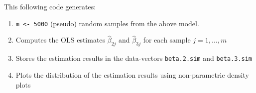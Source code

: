 \documentclass[
]{book}
\providecommand{\tightlist}{%
  \setlength{\itemsep}{0pt}\setlength{\parskip}{0pt}}
\begin{document}
\hfill\break

This following code generates:

\begin{enumerate}
\def\labelenumi{\arabic{enumi}.}
\tightlist
\item
  \texttt{m\ \textless{}-\ 5000} (pseudo) random samples from the above model.
\item
  Computes the OLS estimates \(\hat{\beta}_{2j}\) and \(\hat{\beta}_{3j}\) for each sample \(j=1,\dots,m\)
\item
  Stores the estimation results in the data-vectors \texttt{beta.2.sim} and \texttt{beta.3.sim}
\item
  Plots the distribution of the estimation results using non-parametric density plots
\end{enumerate}
\end{document}
